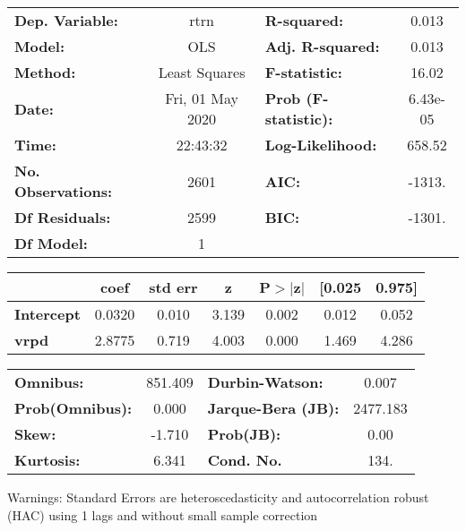 \begin{center}
\begin{tabular}{lclc}
\toprule
\textbf{Dep. Variable:}    &       rtrn       & \textbf{  R-squared:         } &     0.013   \\
\textbf{Model:}            &       OLS        & \textbf{  Adj. R-squared:    } &     0.013   \\
\textbf{Method:}           &  Least Squares   & \textbf{  F-statistic:       } &     16.02   \\
\textbf{Date:}             & Fri, 01 May 2020 & \textbf{  Prob (F-statistic):} &  6.43e-05   \\
\textbf{Time:}             &     22:43:32     & \textbf{  Log-Likelihood:    } &    658.52   \\
\textbf{No. Observations:} &        2601      & \textbf{  AIC:               } &    -1313.   \\
\textbf{Df Residuals:}     &        2599      & \textbf{  BIC:               } &    -1301.   \\
\textbf{Df Model:}         &           1      & \textbf{                     } &             \\
\bottomrule
\end{tabular}
\begin{tabular}{lcccccc}
                   & \textbf{coef} & \textbf{std err} & \textbf{z} & \textbf{P$> |$z$|$} & \textbf{[0.025} & \textbf{0.975]}  \\
\midrule
\textbf{Intercept} &       0.0320  &        0.010     &     3.139  &         0.002        &        0.012    &        0.052     \\
\textbf{vrpd}      &       2.8775  &        0.719     &     4.003  &         0.000        &        1.469    &        4.286     \\
\bottomrule
\end{tabular}
\begin{tabular}{lclc}
\textbf{Omnibus:}       & 851.409 & \textbf{  Durbin-Watson:     } &    0.007  \\
\textbf{Prob(Omnibus):} &   0.000 & \textbf{  Jarque-Bera (JB):  } & 2477.183  \\
\textbf{Skew:}          &  -1.710 & \textbf{  Prob(JB):          } &     0.00  \\
\textbf{Kurtosis:}      &   6.341 & \textbf{  Cond. No.          } &     134.  \\
\bottomrule
\end{tabular}
\end{center}

Warnings: \newline
 [1] Standard Errors are heteroscedasticity and autocorrelation robust (HAC) using 1 lags and without small sample correction